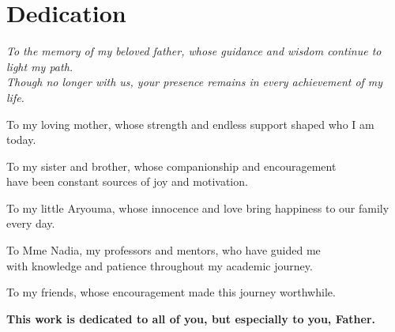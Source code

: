 \chapter*{\centering Dedication}

\begin{center}
{\itshape\large 
To the memory of my beloved father, whose guidance and wisdom continue to light my path. \\
Though no longer with us, your presence remains in every achievement of my life.

\vspace{0.8cm}

To my loving mother, whose strength and endless support shaped who I am today.

\vspace{0.8cm}

To my sister and brother, whose companionship and encouragement \\
have been constant sources of joy and motivation.

\vspace{0.8cm}

To my little Aryouma, whose innocence and love bring happiness to our family every day.

\vspace{0.8cm}

To Mme Nadia, my professors and mentors, who have guided me \\
with knowledge and patience throughout my academic journey.

\vspace{0.8cm}

To my friends, whose encouragement made this journey worthwhile.

\vspace{0.8cm}

\textbf{This work is dedicated to all of you, but especially to you, Father.}
}
\end{center}

\vspace{0.5cm}



